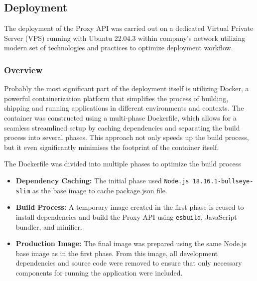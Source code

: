 \subsection{Deployment}
\label{subsec:deployment}
The deployment of the Proxy API was carried out on a dedicated Virtual Private Server (VPS) running with Ubuntu 22.04.3 within company's network utilizing modern set of technologies and practices to optimize deployment workflow.

\subsubsection{Overview}
Probably the most significant part of the deployment itself is utilizing Docker, a powerful containerization platform that simplifies the process of building, shipping and running applications in different environments and contexts. 
The container was constructed using a multi-phase Dockerfile, which allows for a seamless streamlined setup by caching dependencies and separating the build process into several phases.
This approach not only speeds up the build process, but it even significantly minimises the footprint of the container itself.


The Dockerfile was divided into multiple phases to optimize the build process
\begin{itemize}
    \item \textbf{Dependency Caching:} The initial phase used \texttt{Node.js 18.16.1-bullseye-slim} as the base image to cache package.json file.
    \item \textbf{Build Process:} A temporary image created in the first phase is reused to install dependencies and build the Proxy API using \texttt{esbuild}, JavaScript bundler, and minifier. 
    \item \textbf{Production Image:} The final image was prepared using the same Node.js base image as in the first phase. From this image, all development dependencies and source code were removed to ensure that only necessary components for running the application were included.
\end{itemize}


